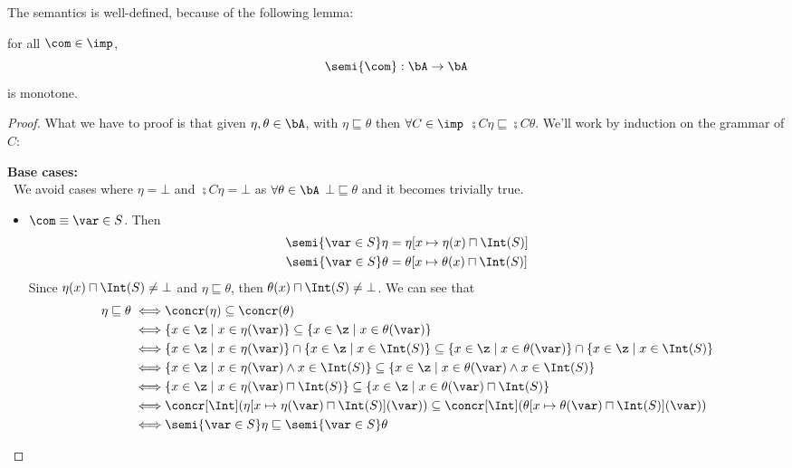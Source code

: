 The semantics is well-defined, because of the following lemma:

\begin{lemma}\label{le:monotone}
  for all \(\com \in \imp\), \[\semi{\com}: \bA \to \bA\] is
  monotone.
\end{lemma}

\begin{proof}
  What we have to proof is that given \(\eta, \theta \in \bA\), with
  \(\eta \sqsubseteq \theta\) then \(\forall C \in \imp\)
  \(\semi{C}\eta \sqsubseteq \semi{C}\theta\). We'll work by induction
  on the grammar of \(C\):
  
  \noindent
  \textbf{Base cases:}\ \\ \ We avoid cases where \(\eta = \bot\) and
  \(\semi{C}\eta = \bot\) as \(\forall \theta \in \bA\) \(\bot
  \sqsubseteq \theta\) and it becomes trivially true.
  \begin{itemize}
  \item \(\com \equiv \var \in S\). Then
    \begin{align*}
      \semi{\var \in S}\eta & = \eta[x\mapsto\eta(x) \sqcap \Int(S)] \\
      \semi{\var \in S}\theta & = \theta[x\mapsto \theta(x) \sqcap \Int(S)]
    \end{align*}
    Since \(\eta(x) \sqcap \Int(S) \neq \bot\) and \(\eta \sqsubseteq
    \theta\), then \(\theta(x) \sqcap \Int(S) \neq \bot\). We can see
    that
    \begin{align*}
      \eta \sqsubseteq \theta \iff & \concr(\eta) \subseteq \concr(\theta) \\
      \iff & \{x\in\z \mid x \in \eta(\var)\} \subseteq \{x\in\z \mid x \in \theta(\var)\} \\
      \iff & \{x\in\z \mid x \in \eta(\var)\} \cap \{x \in \z \mid x \in \Int(S)\} \subseteq \{x\in\z \mid x \in \theta(\var)\} \cap \{x \in \z \mid x \in \Int(S)\} \\
      \iff & \{x \in \z \mid x \in \eta(\var) \wedge x \in \Int(S)\} \subseteq \{x \in \z \mid x \in \theta(\var) \wedge x \in \Int(S)\} \\
      \iff & \{x \in \z \mid x \in \eta(\var) \sqcap \Int(S)\} \subseteq \{x \in \z \mid x \in \theta(\var) \sqcap \Int(S)\} \\
      \iff & \concr[\Int](\eta[x\mapsto \eta(\var) \sqcap \Int(S)](\var)) \subseteq \concr[\Int](\theta[x\mapsto \theta(\var) \sqcap \Int(S)](\var)) \\
      \iff & \semi{\var \in S}\eta \sqsubseteq \semi{\var \in S}\theta

\end{align*}
\end{itemize}
\end{proof}
